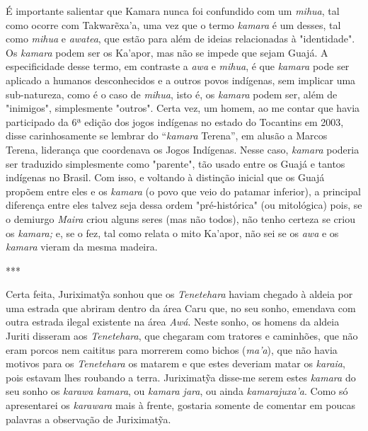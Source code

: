 É importante salientar que Kamara nunca foi confundido com um
\emph{mihua}, tal como ocorre com Takwarẽxa'a, uma vez que o termo
\emph{kamara} é um desses, tal como \emph{mihua} e \emph{awatea}, que
estão para além de ideias relacionadas à "identidade". Os \emph{kamara}
podem ser os Ka'apor, mas não se impede que sejam Guajá. A
especificidade desse termo, em contraste a \emph{awa} e \emph{mihua}, é
que \emph{kamara} pode ser aplicado a humanos desconhecidos e a outros
povos indígenas, sem implicar uma sub-natureza, como é o caso de
\emph{mihua}, isto é, os \emph{kamara} podem ser, além de "inimigos",
simplesmente "outros". Certa vez, um homem, ao me contar que havia
participado da 6ª edição dos jogos indígenas no estado do Tocantins em
2003, disse carinhosamente se lembrar do ``\emph{kamara} Terena'', em
alusão a Marcos Terena, liderança que coordenava os Jogos Indígenas.
Nesse caso, \emph{kamara} poderia ser traduzido simplesmente como
"parente", tão usado entre os Guajá e tantos indígenas no Brasil. Com
isso, e voltando à distinção inicial que os Guajá propõem entre eles e
os \emph{kamara} (o povo que veio do patamar inferior), a principal
diferença entre eles talvez seja dessa ordem "pré-histórica" (ou
mitológica) pois, se o demiurgo \emph{Maira} criou alguns seres (mas não
todos), não tenho certeza se criou os \emph{kamara;} e, se o fez, tal
como relata o mito Ka'apor, não sei se os \emph{awa} e os \emph{kamara}
vieram da mesma madeira.

***

Certa feita, Juriximatỹa sonhou que os \emph{Tenetehara} haviam chegado
à aldeia por uma estrada que abriram dentro da área Caru que, no seu
sonho, emendava com outra estrada ilegal existente na área \emph{Awá}.
Neste sonho, os homens da aldeia Juriti disseram aos \emph{Tenetehara},
que chegaram com tratores e caminhões, que não eram porcos nem caititus
para morrerem como bichos (\emph{ma'a}), que não havia motivos para os
\emph{Tenetehara} os matarem e que estes deveriam matar os
\emph{karaia}, pois estavam lhes roubando a terra. Juriximatỹa disse-me
serem estes \emph{kamara} do seu sonho os \emph{karawa kamara}, ou
\emph{kamara jara}, ou ainda \emph{kamarajuxa'a}. Como só apresentarei
os \emph{karawara} mais à frente, gostaria somente de comentar em poucas
palavras a observação de Juriximatỹa.

